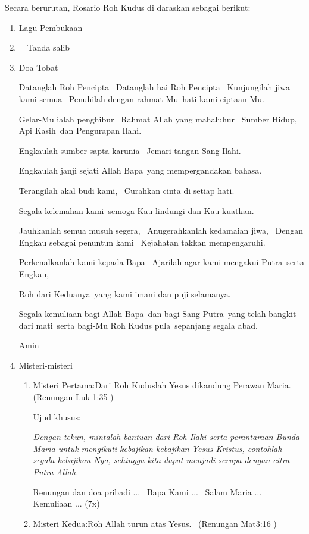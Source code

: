 Secara berurutan, Rosario Roh Kudus di daraskan sebagai berikut:
\begin{enumerate}

\item Lagu Pembukaan
\item \Cross ~~Tanda salib
\item Doa Tobat

Datanglah Roh Pencipta~ Datanglah hai Roh Pencipta~ Kunjungilah jiwa
kami semua~ Penuhilah dengan rahmat-Mu~hati kami ciptaan-Mu.

Gelar-Mu ialah penghibur~ Rahmat Allah yang mahaluhur~ Sumber Hidup, Api
Kasih~dan Pengurapan Ilahi.

Engkaulah sumber sapta karunia~ Jemari tangan Sang Ilahi.

Engkaulah janji sejati Allah Bapa~yang mempergandakan bahasa.

Terangilah akal budi kami,~ Curahkan cinta di setiap hati.

Segala kelemahan kami~semoga Kau lindungi dan Kau kuatkan.

Jauhkanlah semua musuh segera,~ Anugerahkanlah kedamaian jiwa,~ Dengan
Engkau sebagai penuntun kami~ Kejahatan tak{\textquotesingle}kan
mempengaruhi.

Perkenalkanlah kami kepada Bapa~ Ajarilah agar kami mengakui Putra~serta
Engkau, 

Roh dari Keduanya~yang kami imani dan puji selamanya.

Segala kemuliaan bagi Allah Bapa~dan bagi Sang Putra~yang telah bangkit
dari mati~serta bagi-Mu Roh Kudus pula~sepanjang segala abad.

Amin
\item Misteri-misteri
\begin{enumerate}
\item  Misteri Pertama:{\textquotedbl}Dari Roh Kuduslah Yesus dikandung Perawan
Maria.{\textquotedbl}~ (Renungan Luk 1:35 )

Ujud khusus:~

\textit{Dengan tekun, mintalah bantuan dari Roh Ilahi serta perantaraan Bunda
Maria untuk mengikuti kebajikan-kebajikan Yesus Kristus, contohlah
segala kebajikan-Nya, sehingga kita dapat menjadi serupa dengan citra
Putra Allah.}

Renungan dan doa pribadi ...~ Bapa Kami ...~ Salam Maria ...~ Kemuliaan
... (7x)

\item Misteri Kedua:{\textquotedbl}Roh Allah turun atas Yesus.{\textquotedbl}~
(Renungan Mat3:16 )


\end{enumerate}
\end{enumerate}
